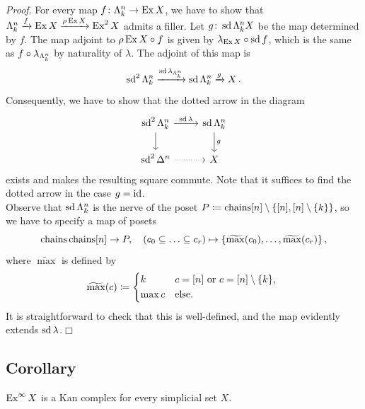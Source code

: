         \emph{Proof}. For every map $f \colon \Lambda^{n}_{k} \to \operatorname{Ex} X$, we have to show that $\Lambda^{n}_{k} \xrightarrow{f} \operatorname{Ex} X \xrightarrow{\rho \operatorname{Ex} X} \operatorname{Ex}^2 X$ admits a filler. Let $g \colon \operatorname{sd} \Lambda^{n}_{k} X$ be the map determined by $f$. The map adjoint to $\rho \operatorname{Ex} X \circ f$ is given by $\lambda_{\operatorname{Ex} X} \circ \operatorname{sd} f$, which is the same as $f \circ \lambda_{\Lambda^{n}_{k}}$ by naturality of $\lambda$. The adjoint of this map is
        \begin{equation*}
            \operatorname{sd}^2 \Lambda^{n}_{k} \xrightarrow{\operatorname{sd} \lambda_{\Lambda^{n}_{k}}} \operatorname{sd} \Lambda^{n}_{k} \xrightarrow{g} X \,.
        \end{equation*}
        Consequently, we have to show that the dotted arrow in the diagram
        \begin{equation*}
            \begin{tikzcd}
                \sd^2 \horn{n}{k} \arrow[d] \arrow[r, "\sd \lambda"] & \sd \horn{n}{k} \arrow[d, "g"] \\
                \sd^2 \Delta^n \arrow[r, dotted] & X
            \end{tikzcd}
        \end{equation*}
        exists and makes the resulting square commute. Note that it suffices to find the dotted arrow in the case $g = \operatorname{id}$.\\
        Observe that $\operatorname{sd} \Lambda^{n}_{k}$ is the nerve of the poset $P \coloneq \operatorname{chains}[n] \setminus \{ [n], [n] \setminus \{k\}\}$, so we have to specify a map of posets
        \begin{equation*}
            \operatorname{chains} \operatorname{chains}[n] \to P, \quad (c_0 \subseteq \ldots \subseteq c_r) \mapsto \{ \widetilde{\max}(c_0), \ldots, \widetilde{\max}(c_r) \} \,,
        \end{equation*}
        where $\widetilde{\max}$ is defined by
        \begin{equation*}
            \widetilde{\max}(c) \coloneq
            \begin{cases*}
                k & $c = [n]$ or $c = [n] \setminus \{k\}$, \\
                \max c & else.
            \end{cases*}
        \end{equation*}
        It is straightforward to check that this is well-defined, and the map evidently extends $\operatorname{sd} \lambda$.\hfill$\Box$

    \subsection{Corollary}\label{chV-4-13}
        $\operatorname{Ex}^{\infty} X$ is a Kan complex for every simplicial set $X$.
        \smallskip

